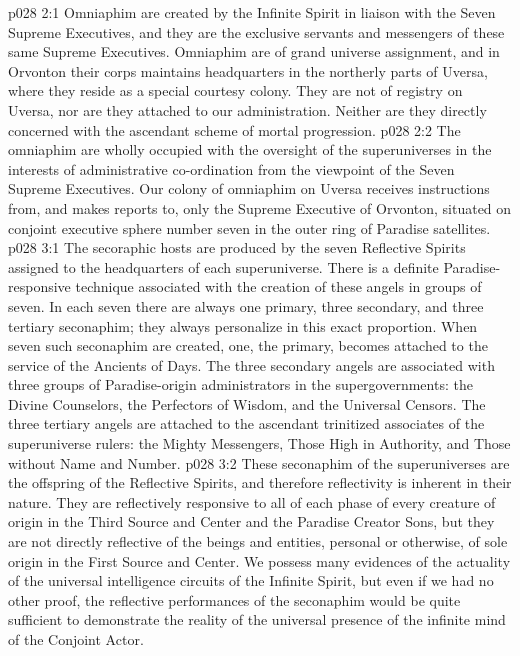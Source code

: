 \vs p028 2:1 Omniaphim are created by the Infinite Spirit in liaison with the Seven Supreme Executives, and they are the exclusive servants and messengers of these same Supreme Executives. Omniaphim are of grand universe assignment, and in Orvonton their corps maintains headquarters in the northerly parts of Uversa, where they reside as a special courtesy colony. They are not of registry on Uversa, nor are they attached to our administration. Neither are they directly concerned with the ascendant scheme of mortal progression.
\vs p028 2:2 The omniaphim are wholly occupied with the oversight of the superuniverses in the interests of administrative co\hyp{}ordination from the viewpoint of the Seven Supreme Executives. Our colony of omniaphim on Uversa receives instructions from, and makes reports to, only the Supreme Executive of Orvonton, situated on conjoint executive sphere number seven in the outer ring of Paradise satellites.\plusone
{}
\vs p028 3:1 The secoraphic hosts are produced by the seven Reflective Spirits assigned to the headquarters of each superuniverse. There is a definite Paradise\hyp{}responsive technique associated with the creation of these angels in groups of seven. In each seven there are always one primary, three secondary, and three tertiary seconaphim; they always personalize in this exact proportion. When seven such seconaphim are created, one, the primary, becomes attached to the service of the Ancients of Days. The three secondary angels are associated with three groups of Paradise\hyp{}origin administrators in the supergovernments: the Divine Counselors, the Perfectors of Wisdom, and the Universal Censors. The three tertiary angels are attached to the ascendant trinitized associates of the superuniverse rulers: the Mighty Messengers, Those High in Authority, and Those without Name and Number.
\vs p028 3:2 These seconaphim of the superuniverses are the offspring of the Reflective Spirits, and therefore reflectivity is inherent in their nature. They are reflectively responsive to all of each phase of every creature of origin in the Third Source and Center and the Paradise Creator Sons, but they are not directly reflective of the beings and entities, personal or otherwise, of sole origin in the First Source and Center. We possess many evidences of the actuality of the universal intelligence circuits of the Infinite Spirit, but even if we had no other proof, the reflective performances of the seconaphim would be quite sufficient to demonstrate the reality of the universal presence of the infinite mind of the Conjoint Actor.
